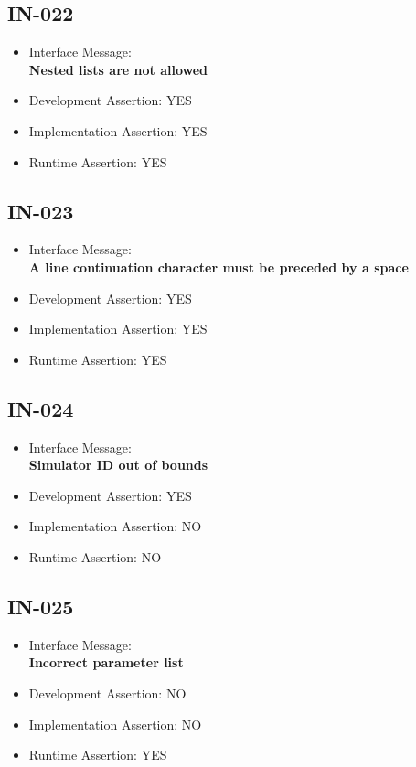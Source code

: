 \subsection{IN-022}
\begin{itemize}
  \item Interface Message:\\[1em]
    \textbf{Nested lists are not allowed}
  \item Development Assertion: YES
  \item Implementation Assertion: YES
  \item Runtime Assertion: YES
\end{itemize}

\subsection{IN-023}
\begin{itemize}
  \item Interface Message:\\[1em]
    \textbf{A line continuation character must be preceded by a space}
  \item Development Assertion: YES
  \item Implementation Assertion: YES
  \item Runtime Assertion: YES
\end{itemize}

\subsection{IN-024}
\begin{itemize}
  \item Interface Message:\\[1em]
    \textbf{Simulator ID out of bounds}
  \item Development Assertion: YES
  \item Implementation Assertion: NO
  \item Runtime Assertion: NO
\end{itemize}

\subsection{IN-025}
\begin{itemize}
  \item Interface Message:\\[1em]
    \textbf{Incorrect parameter list}
  \item Development Assertion: NO
  \item Implementation Assertion: NO
  \item Runtime Assertion: YES
\end{itemize}

